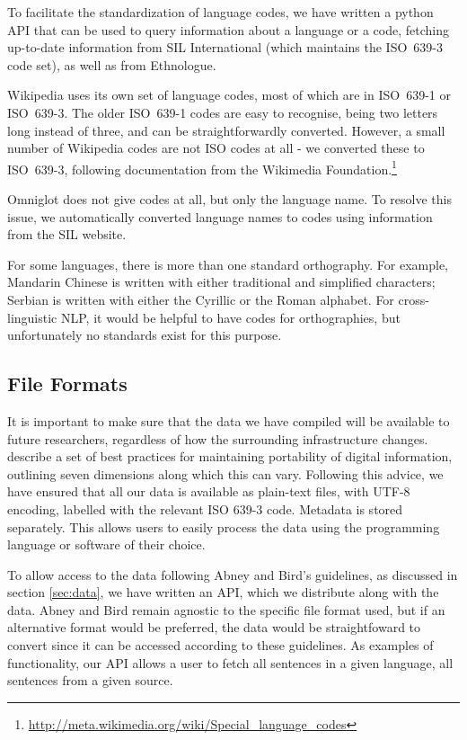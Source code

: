 To facilitate the standardization of language codes, we have written a python API that can be used to query information about a language or a code, fetching up-to-date information from SIL International (which maintains the ISO~639-3 code set), as well as from Ethnologue.

Wikipedia uses its own set of language codes, most of which are in ISO~639-1 or ISO~639-3.  The older ISO~639-1 codes are easy to recognise, being two letters long instead of three, and can be straightforwardly converted.  However, a small number of Wikipedia codes are not ISO codes at all - we converted these to ISO~639-3, following documentation from the Wikimedia Foundation.\footnote{\url{http://meta.wikimedia.org/wiki/Special_language_codes}}

Omniglot does not give codes at all, but only the language name. To resolve this issue, we automatically converted language names to codes using information from the SIL website.

For some languages, there is more than one standard orthography. For example, Mandarin Chinese is written with either traditional and simplified characters; Serbian is written with either the Cyrillic or the Roman alphabet. For cross-linguistic NLP, it would be helpful to have codes for orthographies, but unfortunately no standards exist for this purpose.

\subsection{File Formats}

It is important to make sure that the data we have compiled will be available to future researchers, regardless of how the surrounding infrastructure changes.  describe a set of best practices for maintaining portability of digital information, outlining seven dimensions along which this can vary. Following this advice, we have ensured that all our data is available as plain-text files, with UTF-8 encoding, labelled with the relevant ISO 639-3 code. Metadata is stored separately. This allows users to easily process the data using the programming language or software of their choice.

To allow access to the data following Abney and Bird's guidelines, as discussed in section \ref{sec:data}, we have written an API, which we distribute along with the data.  Abney and Bird remain agnostic to the specific file format used, but if an alternative format would be preferred, the data would be straightfoward to convert since it can be accessed according to these guidelines.  As examples of functionality, our API allows a user to fetch all sentences in a given language, all sentences from a given source.
